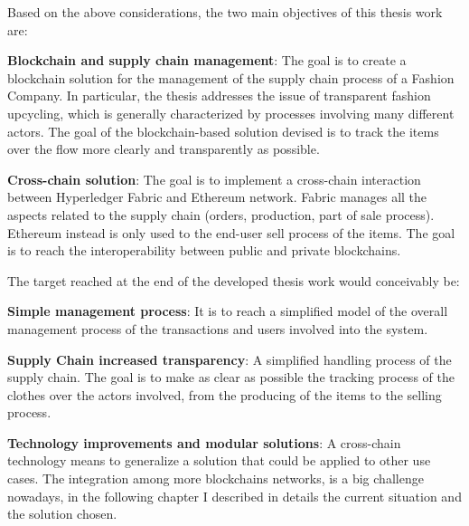 Based on the above considerations, the two main objectives of this thesis work are:
\begin{outline}
    \1 \textbf{Blockchain and supply chain management}: The goal is to create a blockchain solution for the 
    management of the supply chain process of a Fashion Company. In particular, the thesis addresses the 
    issue of transparent fashion upcycling, which is generally characterized by processes involving many 
    different actors. The goal of the blockchain-based solution devised is to track the items over the flow 
    more clearly and transparently as possible.

    \1 \textbf{Cross-chain solution}: The goal is to implement a cross-chain interaction between Hyperledger 
    Fabric and Ethereum network. Fabric manages all the aspects related to the supply chain (orders, 
    production, part of sale process). Ethereum instead is only used to the end-user sell process of 
    the items. The goal is to reach the interoperability between public and private blockchains. 
\end{outline}

\bigskip

The target reached at the end of the developed thesis work would conceivably be:

\begin{outline}
    \1 \textbf{Simple management process}: It is to reach a simplified model of the overall management process of the 
    transactions and users involved into the system. 

    \1 \textbf{Supply Chain increased transparency}: A simplified handling process of the supply chain. The goal is to make as
    clear as possible the tracking process of the clothes over the actors involved, from the producing of the items
    to the selling process. 

    \1 \textbf{Technology improvements and modular solutions}: A cross-chain technology means to generalize a 
    solution that could be applied to other use cases. The integration among more blockchains networks,
    is a big challenge nowadays, in the following chapter I described in details the current situation and 
    the solution chosen. 
\end{outline}

\bigskip

